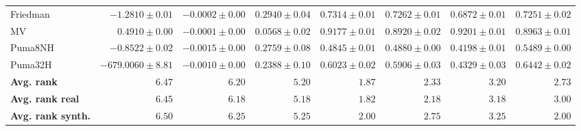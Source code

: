 \begin{table*}[!htbp]
{\begin{tabular}{lrrrrrrr}
		Friedman & $-1.2810 \pm 0.01$ & $-0.0002 \pm 0.00$ & $0.2940 \pm 0.04$ & $\mathbf{0.7314 \pm 0.01}$ & $0.7262 \pm 0.01$ & $0.6872 \pm 0.01$ & $0.7251 \pm 0.02$\\
		MV & $0.4910 \pm 0.00$ & $-0.0001 \pm 0.00$ & $0.0568 \pm 0.02$ & $0.9177 \pm 0.01$ & $0.8920 \pm 0.02$ & $\mathbf{0.9201 \pm 0.01}$ & $0.8963 \pm 0.01$\\
		Puma8NH & $-0.8522 \pm 0.02$ & $-0.0015 \pm 0.00$ & $0.2759 \pm 0.08$ & $0.4845 \pm 0.01$ & $0.4880 \pm 0.00$ & $0.4198 \pm 0.01$ & $\mathbf{0.5489 \pm 0.00}$\\
		Puma32H & $-679.0060 \pm 8.81$ & $-0.0010 \pm 0.00$ & $0.2388 \pm 0.10$ & $0.6023 \pm 0.02$ & $0.5906 \pm 0.03$ & $0.4329 \pm 0.03$ & $\mathbf{0.6442 \pm 0.02}$\\
		\midrule
		\textbf{{Avg. rank}} & $6.47$ & $6.20$ & $5.20$ & $\mathbf{1.87}$ & $2.33$ & $3.20$ & $2.73$\\
		\textbf{{Avg. rank real}} & $6.45$ & $6.18$ & $5.18$ & $\mathbf{1.82}$ & $2.18$ & $3.18$ & $3.00$\\
		\textbf{{Avg. rank synth.}} & $6.50$ & $6.25$ & $5.25$ & $\mathbf{2.00}$ & $2.75$ & $3.25$ & $\mathbf{2.00}$\\
		\bottomrule
	\end{tabular}}
\end{table*}

